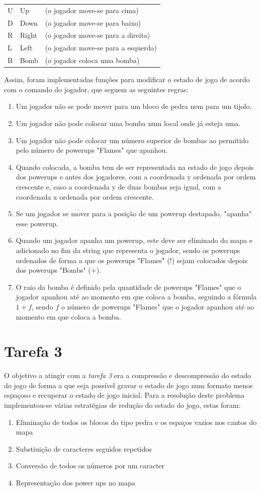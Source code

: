 \documentclass[a4paper]{article}
\begin{document}
\begin{tabular}[c]{lll}
U & Up & (o jogador move-se para cima) \\
D & Down & (o jogador move-se para baixo) \\
R & Right & (o jogador move-se para a direita) \\
L & Left & (o jogador move-se para a esquerda) \\
B & Bomb & (o jogador coloca uma bomba)
\end{tabular}

Assim, foram implementadas funções para modificar o estado de jogo de acordo com o comando do jogador, que seguem as seguintes regras:
\begin{enumerate}
  \item Um jogador não se pode mover para um bloco de pedra nem para um tijolo.
  \item Um jogador não pode colocar uma bomba num local onde já esteja uma.
  \item Um jogador não pode colocar um número superior de bombas ao permitido pelo número de powerups "Flames" que apanhou.
  \item Quando colocada, a bomba tem de ser representada na estado de jogo depois dos powerups e antes dos jogadores, com a coordenada y ordenada por ordem crescente e, caso a coordenada y de duas bombas seja igual, com a coordenada x ordenada por ordem crescente.
  \item Se um jogador se mover para a posição de um powerup destapado, "apanha" esse powerup.
  \item Quando um jogador apanha um powerup, este deve ser eliminado do mapa e adicionado no fim da string que representa o jogador, sendo os powerups ordenados de forma a que os powerups "Flames" (!) sejam colocados depois dos powerups "Bombs" (+).
  \item O raio da bomba é definido pela quantidade de powerups "Flames" que o jogador apanhou até ao momento em que coloca a bomba, seguindo a fórmula \(1+f\), sendo \(f\) o número de powerups "Flames" que o jogador apanhou até ao momento em que coloca a bomba.
\end{enumerate}


\section{Tarefa 3}
\label{tarefa3}

O objetivo a atingir com a \emph{tarefa 3} era a compressão e descompressão
do estado do jogo de forma a que seja possível gravar o estado de jogo num
formato menos espaçoso e recuperar o estado de jogo inicial.
Para a resolução deste problema implementou-se várias estratégias de redução
do estado do jogo, estas foram:
\begin{enumerate}
  \item Eliminação de todos os blocos do tipo pedra e os espaços vazios nos cantos do mapa
  \item Substiuição de caracteres seguidos repetidos
  \item Conversão de todos os números por um caracter
  \item Representação dos power ups no mapa
\end{enumerate}
\end{document}
